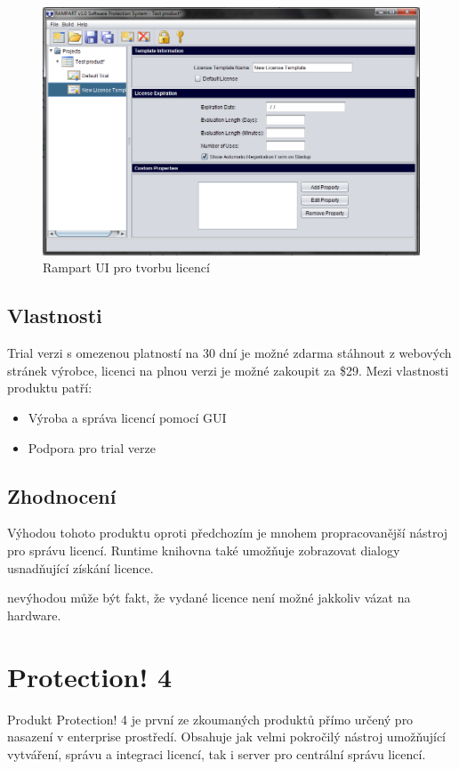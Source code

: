 \begin{figure}[TB]
\begin{center}
\includegraphics[width=12cm]{figures/rampart.PNG}
\caption{Rampart UI pro tvorbu licencí}
\label{fig:rampart-ui} 
\end{center}
\end{figure}

\subsection*{Vlastnosti}
Trial verzi s omezenou platností na 30 dní je možné zdarma stáhnout z webových
stránek výrobce, licenci na plnou verzi je možné zakoupit za \$29. Mezi
vlastnosti produktu patří:

\begin{itemize}
  \item Výroba a správa licencí pomocí \gls{GUI}
  \item Podpora pro trial verze
\end{itemize}

\subsection*{Zhodnocení}
Výhodou tohoto produktu oproti předchozím je mnohem propracovanější nástroj pro
správu licencí. Runtime knihovna také umožňuje zobrazovat dialogy usnadňující
získání licence.

nevýhodou může být fakt, že vydané licence není možné jakkoliv vázat na
hardware.

\section{Protection! 4}

Produkt Protection! 4\cite{protection} je první ze zkoumaných produktů přímo
určený pro nasazení v enterprise prostředí. Obsahuje jak velmi pokročilý nástroj
umožňující vytváření, správu a integraci licencí, tak i server pro centrální
správu licencí.

